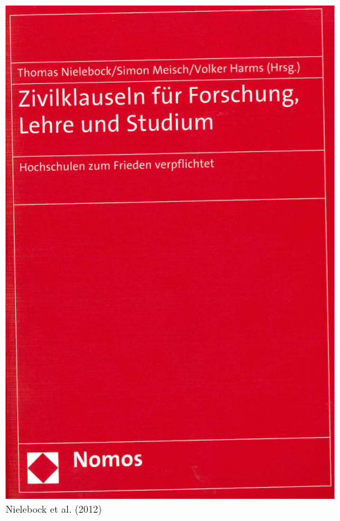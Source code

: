 \documentclass[presentation]{beamer}
\begin{document}
\begin{frame}
\begin{columns}[t]
\begin{column}{0.25\textwidth}
\includegraphics[width=\textwidth]{./nielebock.png}
\newline
\tiny Nielebock et al. (2012)
\end{column}
\begin{column}{0.25\textwidth}
\label{sec-5-1-1-4}


\end{column}
\end{columns}
\end{frame}
\end{document}
